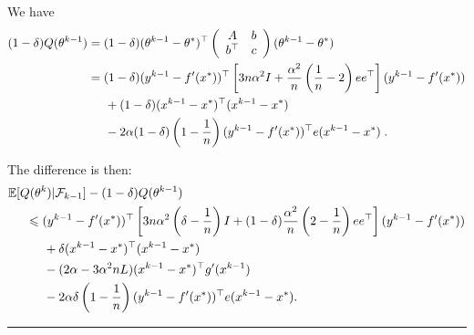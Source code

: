 \documentclass{article}
\newcommand{\idm}{I}
\newcommand{\BlackBox}{\rule{1.5ex}{1.5ex}}  %
\newenvironment{proof}{\par\noindent{\bf Proof\ }}{\hfill\BlackBox\\[2mm]}
\def\E{_{\scriptscriptstyle E}}
\def \E{{\mathbb E}}
\def \E{{\mathbb E}}
\begin{document}
\begin{proof}
We have
\begin{align*}
(1 - \delta)Q(\theta^{k-1}) &= (1 - \delta)(\theta^{k-1} - \theta^\ast)^\top
\left(
\begin{array}{cc} A & b \\ b^\top & c
\end{array}
\right)
(\theta^{k-1} - \theta^\ast)\\
&= ( 1- \delta)  (y^{k-1} - f'(x^\ast))^\top
\left[ 3n \alpha^2 \idm + \frac{\alpha^2}{n} \left(\frac{1}{n} - 2 \right)ee^\top \right]
(y^{k-1} - f'(x^\ast)) \\
& \hspace*{.5cm} + ( 1 - \delta) (x^{k-1} -x^\ast)^\top
(x^{k-1} -x^\ast)\\
& \hspace*{.5cm} - 2\alpha ( 1 - \delta) \left(1-\frac{1}{n}\right)(y^{k-1} - f'(x^\ast))^\top  e (x^{k-1} -x^\ast) \; .
\end{align*}

The difference is then:
\begin{align*}
&\E [ Q(\theta^k) | \mathcal{F}_{k-1} ]  - (1 - \delta)Q(\theta^{k-1})\\
&\hspace*{.5cm}\leqslant (y^{k-1} - f'(x^\ast))^\top \left[
3 n \alpha^2 \left( \delta - \frac{1}{n} \right) \idm
+ ( 1 - \delta) \frac{\alpha^2}{n} \left( 2 - \frac{1}{n} \right) ee^\top
\right] (y^{k-1} - f'(x^\ast))
\\
& \hspace*{1cm}+ \delta (x^{k-1} -x^\ast)^\top
(x^{k-1} -x^\ast)\\
&\hspace*{1cm} - ( {2 \alpha} - 3 \alpha^2 n L ) (x^{k-1} -x^\ast)^\top g'(x^{k-1}) \\
&\hspace*{1cm} - 2\alpha \delta \left(1-\frac{1}{n}\right)(y^{k-1} - f'(x^\ast))^\top  e (x^{k-1} -x^\ast).
\end{align*}


\end{proof}
\end{document}
